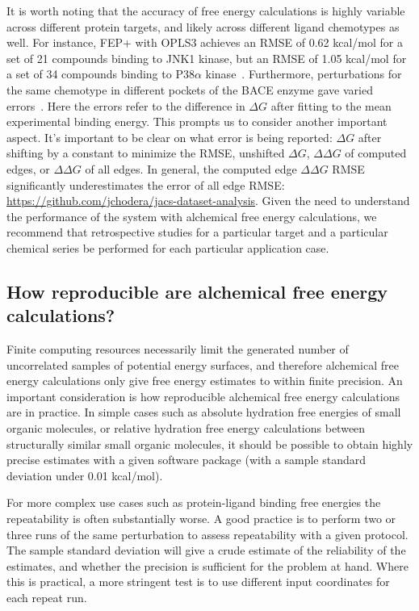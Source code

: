 \documentclass[9pt,bestpractices]{livecoms}
\begin{document}
It is worth noting that the accuracy of free energy calculations is highly variable across different protein targets, and likely across different ligand chemotypes as well.
For instance, FEP+ with OPLS3 achieves an RMSE of 0.62 kcal/mol for a set of 21 compounds binding to JNK1 kinase, but an RMSE of 1.05 kcal/mol for a set of 34 compounds binding to P38$\alpha$ kinase~\cite{harder2016opls3}.
Furthermore, perturbations for the same chemotype in different pockets of the BACE enzyme gave varied errors~\cite{keranen2017acylguanidine}. Here the errors refer to the difference in $\Delta G$ after fitting to the mean experimental binding energy. This prompts us to consider another important aspect. It's important to be clear on what error is being reported: $\Delta G$ after shifting by a constant to minimize the RMSE, unshifted $\Delta G$, $\Delta \Delta G$ of computed edges, or $\Delta \Delta G$ of all edges. In general, the computed edge $\Delta \Delta G$ RMSE significantly underestimates the error of all edge RMSE: \url{https://github.com/jchodera/jacs-dataset-analysis}. Given the need to understand the performance of the system with alchemical free energy calculations, we recommend that retrospective studies for a particular target and a particular chemical series be performed for each particular application case.
%
\subsection{How reproducible are alchemical free energy calculations?}
\label{subsec:reproducible}
Finite computing resources necessarily limit the generated number of uncorrelated samples of potential energy surfaces, and therefore alchemical free energy calculations only give free energy estimates to within finite precision. An important consideration is how reproducible alchemical free energy calculations are in practice. In simple cases such as absolute hydration free energies of small organic molecules, or relative hydration free energy calculations between structurally similar small organic molecules, it should be possible to obtain highly precise estimates with a given software package (with a sample standard deviation under 0.01 kcal/mol). 

For more complex use cases such as protein-ligand binding free energies the repeatability is often substantially worse. A good practice is to perform two or three runs of the same perturbation to assess repeatability with a given protocol. The sample standard deviation will give a crude estimate of the reliability of the estimates, and whether the precision is sufficient for the problem at hand. Where this is practical, a more stringent test is to use different input coordinates for each repeat run. 
\end{document}
